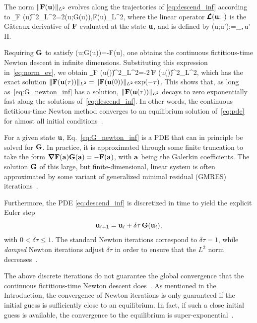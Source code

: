 \documentclass{jfm}
\begin{document}
The norm $\|\mathbf F
(\mathbf u)\|_{L^2}$ evolves along the trajectories of \eqref{eq:descend_inf} according to
\beq
\partial_\tau \|\vc F
(\vc u)\|^2_{L^2}=2\langle {}(\vc u;\vc G(\vc u)),\vc F(\vc u)\rangle_{L^2},
\label{eq:norm_ev}
\eeq
where the linear
operator $\pmb{\mathcal L}(\mathbf u;\cdot)$ is the G\^ateaux derivative of $\mathbf F$ evaluated
at the state $\mathbf u$, and is defined by
\beq
{}(\vc u;\vc u'):=\lim_{\epsilon{}},\quad \forall\,\vc u' \in\mathcal H.
\eeq

Requiring  $\mathbf G$ to satisfy
\beq
{}(\vc u;\vc G(\vc u))=-\vc F(\vc u),
\label{eq:G_newton_inf}
\eeq
one obtains the continuous fictitious-time Newton descent in infinite dimensions.
Substituting this expression in~\eqref{eq:norm_ev}, we obtain
\beq
\partial_\tau \|\vc F
(\vc u(\tau))\|^2_{L^2}=-2 \|\vc F
(\vc u(\tau))\|^2_{L^2},
\eeq
which has the exact solution $\|\mathbf F(\mathbf u(\tau))\|_{L^2}=\|\mathbf F(\mathbf u(0))\|_{L^2}\exp(-\tau)$.
This shows that, as long as~\eqref{eq:G_newton_inf} has
a solution, $\|\mathbf F(\mathbf u(\tau))\|_{L^2}$ decays to zero exponentially fast
along the solutions of~\eqref{eq:descend_inf}. In other words, the continuous fictitious-time
Newton method converges to an equilibrium solution of~\eqref{eq:pde} for
almost all initial conditions~\citep{saupe88,CvitLanCrete02,lanVar1}.

For a given state $\mathbf u$, Eq.~\eqref{eq:G_newton_inf} is a PDE that can in principle be solved
for $\mathbf G$. In practice, it is approximated through some finite truncation
to take the form $\mbox{\boldmath $\nabla$}\mathbf F(\mathbf a)\mathbf G(\mathbf a)=-\mathbf F(\mathbf a)$, with $\mathbf a$ being the
Galerkin coefficients.
The solution $\mathbf G$ of this large, but finite-dimensional, linear system is often
approximated by some variant of
generalized minimal residual (GMRES) iterations~\citep{Trefethen97}.

Furthermore, the PDE \eqref{eq:descend_inf} is discretized in time to yield the explicit Euler step
\begin{equation}
\mathbf u_{i+1}=\mathbf u_i +\delta\tau\, \mathbf G(\mathbf u_i),
\label{eq:Eul_it}
\end{equation}
with $0<\delta\tau\leq 1$. The standard Newton iterations correspond to $\delta\tau=1$, while
\emph{damped} Newton iterations adjust $\delta\tau$ in order to ensure that the $L^2$ norm
decreases~\citep{boyd04}.

The above discrete iterations do not guarantee the global
convergence that the continuous fictitious-time Newton descent does~\citep{saupe88}. As mentioned
in the Introduction,
the convergence of Newton iterations is only guaranteed if the initial guess
is sufficiently close to an equilibrium. In fact, if such a close initial guess is
available, the convergence to the equilibrium is super-exponential~\citep{Deuf11}.
\end{document}
